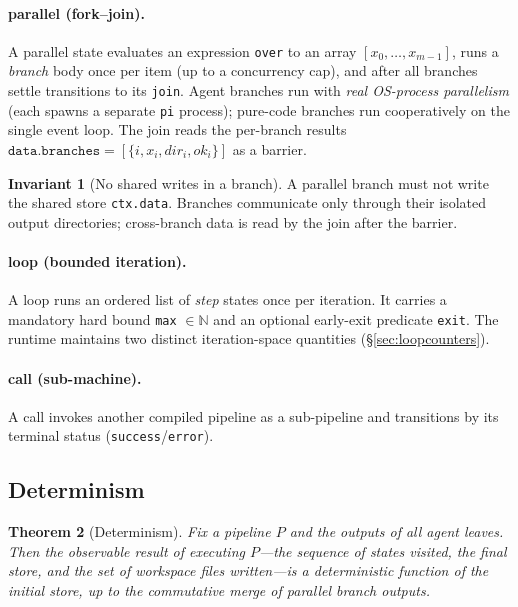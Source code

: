 \documentclass[11pt]{article}
\theoremstyle{plain}
\newtheorem{theorem}{Theorem}[section]
\theoremstyle{definition}
\newtheorem{invariant}[theorem]{Invariant}
\theoremstyle{remark}
\newcommand{\code}[1]{\texttt{#1}}
\newcommand{\state}[1]{\textsf{#1}}
\newcommand{\Nat}{\mathbb{N}}
\begin{document}
\paragraph{\state{parallel} (fork--join).}
A \state{parallel} state evaluates an expression \code{over} to an array
$[x_0,\dots,x_{m-1}]$, runs a \emph{branch} body once per item (up to a concurrency
cap), and after all branches settle transitions to its \code{join}. Agent branches
run with \emph{real OS-process parallelism} (each spawns a separate \code{pi}
process); pure-code branches run cooperatively on the single event loop. The join
reads the per-branch results $\code{data.branches} = [\{i, x_i, \mathit{dir}_i,
\mathit{ok}_i\}]$ as a barrier.

\begin{invariant}[No shared writes in a branch]\label{inv:branch}
A \state{parallel} branch must not write the shared store \code{ctx.data}.
Branches communicate only through their isolated output directories; cross-branch
data is read by the join after the barrier.
\end{invariant}

\paragraph{\state{loop} (bounded iteration).}
A \state{loop} runs an ordered list of \emph{step} states once per iteration. It
carries a mandatory hard bound \code{max} $\in \Nat$ and an optional early-exit
predicate \code{exit}. The runtime maintains two distinct iteration-space
quantities (\S\ref{sec:loopcounters}).

\paragraph{\state{call} (sub-machine).}
A \state{call} invokes another compiled pipeline as a sub-pipeline and transitions
by its terminal status (\code{success}/\code{error}).

\subsection{Determinism}

\begin{theorem}[Determinism]\label{thm:determinism}
Fix a pipeline $P$ and the outputs of all agent leaves. Then the observable result
of executing $P$---the sequence of states visited, the final store, and the set of
workspace files written---is a deterministic function of the initial store, up to
the commutative merge of \state{parallel} branch outputs.
\end{theorem}
\end{document}
